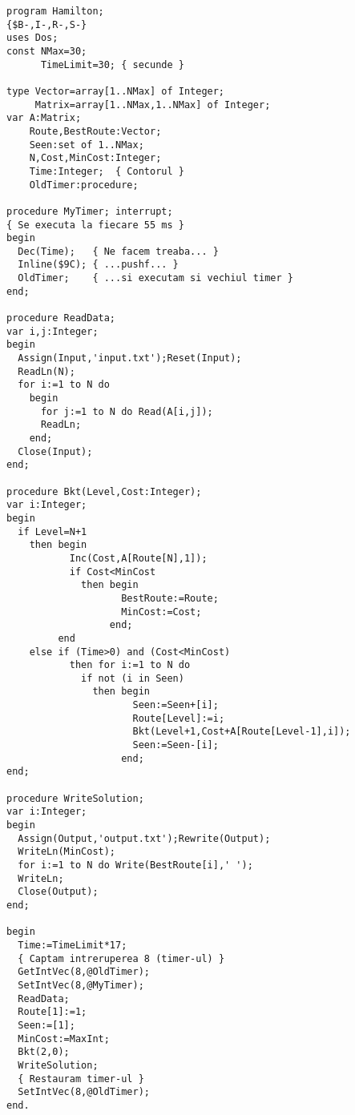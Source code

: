 \begin{verbatim}
program Hamilton;
{$B-,I-,R-,S-}
uses Dos;
const NMax=30;
      TimeLimit=30; { secunde }

type Vector=array[1..NMax] of Integer;
     Matrix=array[1..NMax,1..NMax] of Integer;
var A:Matrix;
    Route,BestRoute:Vector;
    Seen:set of 1..NMax;
    N,Cost,MinCost:Integer;
    Time:Integer;  { Contorul }
    OldTimer:procedure;

procedure MyTimer; interrupt;
{ Se executa la fiecare 55 ms }
begin
  Dec(Time);   { Ne facem treaba... }
  Inline($9C); { ...pushf... }
  OldTimer;    { ...si executam si vechiul timer }
end;

procedure ReadData;
var i,j:Integer;
begin
  Assign(Input,'input.txt');Reset(Input);
  ReadLn(N);
  for i:=1 to N do
    begin
      for j:=1 to N do Read(A[i,j]);
      ReadLn;
    end;
  Close(Input);
end;

procedure Bkt(Level,Cost:Integer);
var i:Integer;
begin
  if Level=N+1
    then begin
           Inc(Cost,A[Route[N],1]);
           if Cost<MinCost
             then begin
                    BestRoute:=Route;
                    MinCost:=Cost;
                  end;
         end
    else if (Time>0) and (Cost<MinCost)
           then for i:=1 to N do
             if not (i in Seen)
               then begin
                      Seen:=Seen+[i];
                      Route[Level]:=i;
                      Bkt(Level+1,Cost+A[Route[Level-1],i]);
                      Seen:=Seen-[i];
                    end;
end;

procedure WriteSolution;
var i:Integer;
begin
  Assign(Output,'output.txt');Rewrite(Output);
  WriteLn(MinCost);
  for i:=1 to N do Write(BestRoute[i],' ');
  WriteLn;
  Close(Output);
end;

begin
  Time:=TimeLimit*17;
  { Captam intreruperea 8 (timer-ul) }
  GetIntVec(8,@OldTimer);
  SetIntVec(8,@MyTimer);
  ReadData;
  Route[1]:=1;
  Seen:=[1];
  MinCost:=MaxInt;
  Bkt(2,0);
  WriteSolution;
  { Restauram timer-ul }
  SetIntVec(8,@OldTimer);
end.
\end{verbatim}

